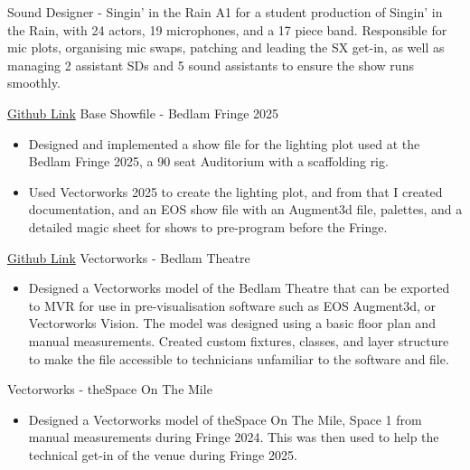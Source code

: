 \documentclass[../../cv-cs.tex]{subfiles}
\begin{document}
\cvlinkevent
{}
{Sound Designer - Singin' in the Rain}
{A1 for a student production of Singin' in the Rain, with 24 actors, 19 microphones, and a 17 piece band. Responsible for mic plots, organising mic swaps, patching and leading the SX get-in, as well as managing 2 assistant SDs and 5 sound assistants to ensure the show runs smoothly.}

\cvlinkevent
{\href{https://github.com/leon0241/Bedlam-Fringe-Showfile-25}{Github Link}}
{Base Showfile - Bedlam Fringe 2025}
{\begin{itemize}
    \item Designed and implemented a show file for the lighting plot used at the Bedlam Fringe 2025, a 90 seat Auditorium with a scaffolding rig.
    \item Used Vectorworks 2025 to create the lighting plot, and from that I created documentation, and an EOS show file with an Augment3d file, palettes, and a detailed magic sheet for shows to pre-program before the Fringe.
\end{itemize}}

\cvlinkevent
{\href{https://github.com/EdinburghUniversityTheatreCompany/bedlam-vwx}{Github Link}}
{Vectorworks - Bedlam Theatre}
{\begin{itemize}
    \item Designed a Vectorworks model of the Bedlam Theatre that can be exported to MVR for use in pre-visualisation software such as EOS Augment3d, or Vectorworks Vision. The model was designed using a basic floor plan and manual measurements. Created custom fixtures, classes, and layer structure to make the file accessible to technicians unfamiliar to the software and file.
\end{itemize}}

\cvlinkevent
{}
{Vectorworks - theSpace On The Mile}
{\begin{itemize}
    \item Designed a Vectorworks model of theSpace On The Mile, Space 1 from manual measurements during Fringe 2024. This was then used to help the technical get-in of the venue during Fringe 2025.
\end{itemize}}
\end{document}
